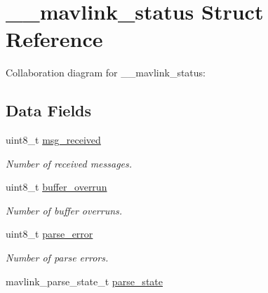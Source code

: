 \hypertarget{struct____mavlink__status}{}\section{\+\_\+\+\_\+mavlink\+\_\+status Struct Reference}
\label{struct____mavlink__status}


Collaboration diagram for \+\_\+\+\_\+mavlink\+\_\+status\+:
\subsection*{Data Fields}
\begin{DoxyCompactItemize}
\item 
uint8\+\_\+t \hyperlink{struct____mavlink__status_ab029d89ac450568aed34a07d20c748d7}{msg\+\_\+received}\hypertarget{struct____mavlink__status_ab029d89ac450568aed34a07d20c748d7}{}\label{struct____mavlink__status_ab029d89ac450568aed34a07d20c748d7}

\begin{DoxyCompactList}\small\item\em Number of received messages. \end{DoxyCompactList}\item 
uint8\+\_\+t \hyperlink{struct____mavlink__status_a46645179d13142df11bbf65dd46e3763}{buffer\+\_\+overrun}\hypertarget{struct____mavlink__status_a46645179d13142df11bbf65dd46e3763}{}\label{struct____mavlink__status_a46645179d13142df11bbf65dd46e3763}

\begin{DoxyCompactList}\small\item\em Number of buffer overruns. \end{DoxyCompactList}\item 
uint8\+\_\+t \hyperlink{struct____mavlink__status_a00f0bf638777ef02791bdb2d21209d75}{parse\+\_\+error}\hypertarget{struct____mavlink__status_a00f0bf638777ef02791bdb2d21209d75}{}\label{struct____mavlink__status_a00f0bf638777ef02791bdb2d21209d75}

\begin{DoxyCompactList}\small\item\em Number of parse errors. \end{DoxyCompactList}\item 
mavlink\+\_\+parse\+\_\+state\+\_\+t \hyperlink{struct____mavlink__status_a55340ddbc135478dc09ae22ba9d254b2}{parse\+\_\+state}\hypertarget{struct____mavlink__status_a55340ddbc135478dc09ae22ba9d254b2}{}\label{struct____mavlink__status_a55340ddbc135478dc09ae22ba9d254b2}


\end{DoxyCompactItemize}
